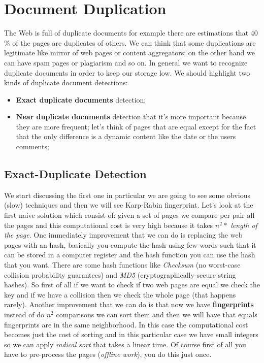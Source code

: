 \chapter{Document Duplication}
The Web is full of duplicate documents for example there are estimations that 40 \% of the pages are duplicates of others. We can think that some duplications are legitimate like mirror of web pages or content aggregators; on the other hand we can have spam pages or plagiarism and so on.\newline
In general we want to recognize duplicate documents in order to keep our storage low.\newline
We should highlight two kinds of duplicate document detections:
\begin{itemize}
    \item \textbf{Exact duplicate documents} detection;
    \item \textbf{Near duplicate documents} detection that it's more important because they are more frequent; let's think of pages that are equal except for the fact that the only difference is a dynamic content like the date or the users comments;
\end{itemize}
\section{Exact-Duplicate Detection}
We start discussing the first one in particular we are going to see some obvious (slow) techniques and then we will see Karp-Rabin fingerprint.\newline
Let's look at the first naive solution which consist of: given a set of pages we compare per pair all the pages and this computational cost is very high because it takes $n^2*$ \textit{length of the page}.\newline
One immediately improvement that we can do is replacing the web pages with an hash, basically you compute the hash using few words such that it can be stored in a computer register and the hash function you can use the hash that you want. There are some hash functions like \textit{Checksum} (no worst-case collision probability guarantees) and \textit{MD5} (cryptographically-secure string hashes). So first of all if we want to check if two web pages are equal we check the key and if we have a collision then we check the whole page (that happens rarely).\newline
Another improvement that we can do is that now we have \textbf{fingerprints} instead of do $n^2$ comparisons we can sort them and then we will have that equals fingerprints are in the same neighborhood. In this case the computational cost becomes just the cost of sorting and in this particular case we have small integers so we can apply \textit{radical sort} that takes a linear time. Of course first of all you have to pre-process the pages (\textit{offline work}), you do this just once.\newline
